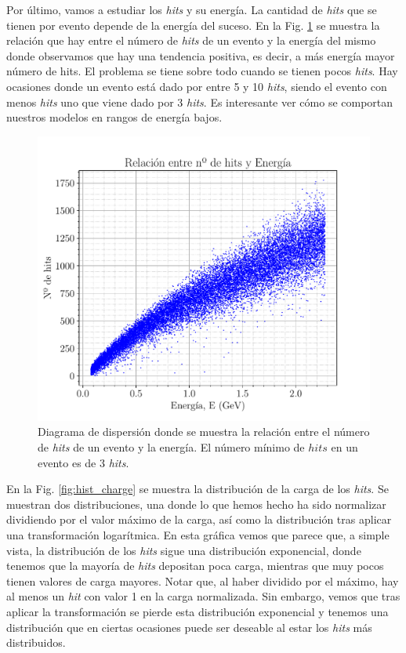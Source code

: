 \documentclass[a4paper,12pt,oneside,titlepage]{book}
\begin{document}
Por último, vamos a estudiar los \textit{hits} y su energía. La cantidad de \textit{hits} que se tienen por evento depende de la energía del suceso. En la Fig. \ref{fig:scatter_n_e} se muestra la relación que hay entre el número de \textit{hits} de un evento y la energía del mismo donde observamos que hay una tendencia positiva, es decir, a más energía mayor número de hits. El problema se tiene sobre todo cuando se tienen pocos \textit{hits}. Hay ocasiones donde un evento está dado por entre 5 y 10 \textit{hits}, siendo el evento con menos \textit{hits} uno que viene dado por 3 \textit{hits}. Es interesante ver cómo se comportan nuestros modelos en rangos de energía bajos.

\begin{figure}[h!]
  \centering
  \includegraphics[scale=0.85]{scatter_n_e.pdf}
  \caption{Diagrama de dispersión donde se muestra la relación entre el número de \textit{hits} de un evento y la energía. El número mínimo de $hits$ en un evento es de 3 \textit{hits}.}
  \label{fig:scatter_n_e}
\end{figure}


En la Fig. \ref{fig:hist_charge} se muestra la distribución de la carga de los \textit{hits}. Se muestran dos distribuciones, una donde lo que hemos hecho ha sido normalizar dividiendo por el valor máximo de la carga, así como la distribución tras aplicar una transformación logarítmica. En esta gráfica vemos que parece que, a simple vista, la distribución de los \textit{hits} sigue una distribución exponencial, donde tenemos que la mayoría de \textit{hits} depositan poca carga, mientras que muy pocos tienen valores de carga mayores. Notar que, al haber dividido por el máximo, hay al menos un \textit{hit} con valor 1 en la carga normalizada. Sin embargo, vemos que tras aplicar la transformación se pierde esta distribución exponencial y tenemos una distribución que en ciertas ocasiones puede ser deseable al estar los \textit{hits} más distribuidos.
\end{document}
